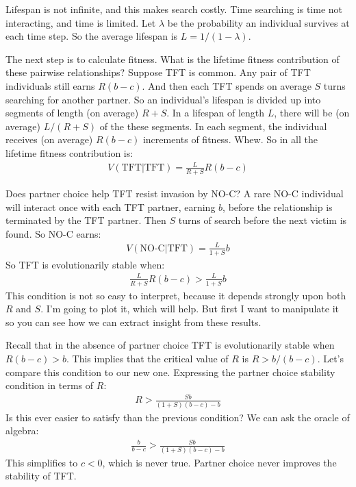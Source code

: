 \documentclass[10pt,reqno]{amsbook}
\numberwithin{equation}{chapter}
\begin{document}
Lifespan is not infinite, and this makes search costly. Time searching is time not interacting, and time is limited. Let $\lambda$ be the probability an individual survives at each time step. So the average lifespan is $L=1/(1-\lambda)$.

The next step is to calculate fitness. What is the lifetime fitness contribution of these pairwise relationships? Suppose TFT is common. Any pair of TFT individuals still earns $R(b-c)$. And then each TFT spends on average $S$ turns searching for another partner. So an individual's lifespan is divided up into segments of length (on average) $R+S$. In a lifespan of length $L$, there will be (on average) $L/(R+S)$ of the these segments. In each segment, the individual receives (on average) $R(b-c)$ increments of fitness. Whew. So in all the lifetime fitness contribution is:
\begin{align*}
	V(\text{TFT}|\text{TFT}) = \frac{L}{R+S}R(b-c)
\end{align*}

Does partner choice help TFT resist invasion by NO-C? A rare NO-C individual will interact once with each TFT partner, earning $b$, before the relationship is terminated by the TFT partner. Then $S$ turns of search before the next victim is found. So NO-C earns:
\begin{align*}
	V(\text{NO-C}|\text{TFT}) = \frac{L}{1+S}b
\end{align*}
So TFT is evolutionarily stable when:
\begin{align*}
	\frac{L}{R+S}R(b-c) > \frac{L}{1+S}b
\end{align*}
This condition is not so easy to interpret, because it depends strongly upon both $R$ and $S$. I'm going to plot it, which will help. But first I want to manipulate it so you can see how we can extract insight from these results. 

Recall that in the absence of partner choice TFT is evolutionarily stable when $R(b-c)>b$. This implies that the critical value of $R$ is $R>b/(b-c)$. Let's compare this condition to our new one. Expressing the partner choice stability condition in terms of $R$:
\begin{align*}
	R > \frac{Sb}{(1+S)(b-c)-b}
\end{align*}
Is this ever easier to satisfy than the previous condition? We can ask the oracle of algebra:
\begin{align*}
	\frac{b}{b-c} > \frac{Sb}{(1+S)(b-c)-b}
\end{align*}
This simplifies to $c<0$, which is never true. Partner choice never improves the stability of TFT.
\end{document}
